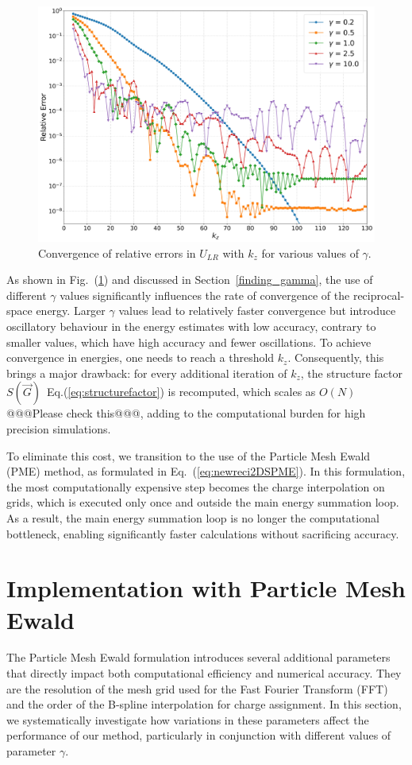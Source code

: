 \begin{figure}[htbp]
    \centering
    \includegraphics[scale=0.4]{images/logerror_vs_kz_forreport.jpg}
    \caption{Convergence of relative errors in $U_{LR}$ with $k_z$ for various values of $\gamma$.}
    \label{fig:convergence_gamma}
\end{figure}

As shown in Fig.~(\ref{fig:convergence_gamma}) and discussed in Section~\ref{finding_gamma}, the use of different $\gamma$ values significantly influences the rate of convergence of the reciprocal-space energy. Larger $\gamma$ values lead to relatively faster convergence but introduce oscillatory behaviour in the energy estimates with low accuracy, contrary to smaller values, which have high accuracy and fewer oscillations. To achieve convergence in energies, one needs to reach a threshold $k_z$. Consequently, this brings a major drawback: for every additional iteration of $k_z$, the structure factor $S(\vec G)$~Eq.(\ref{eq:structurefactor}) is recomputed, which scales as $O(N)$@@@Please check this@@@, adding to the computational burden for high precision simulations. 

To eliminate this cost, we transition to the use of the Particle Mesh Ewald (PME) method, as formulated in Eq.~(\ref{eq:newreci2DSPME}). In this formulation, the most computationally expensive step becomes the charge interpolation on grids, which is executed only once and outside the main energy summation loop. As a result, the main energy summation loop is no longer the computational bottleneck, enabling significantly faster calculations without sacrificing accuracy.

\section{Implementation with Particle Mesh Ewald}
The Particle Mesh Ewald formulation introduces several additional parameters that directly impact both computational efficiency and numerical accuracy. They are the resolution of the mesh grid used for the Fast Fourier Transform (FFT) and the order of the B-spline interpolation for charge assignment. In this section, we systematically investigate how variations in these parameters affect the performance of our method, particularly in conjunction with different values of parameter $\gamma$.

